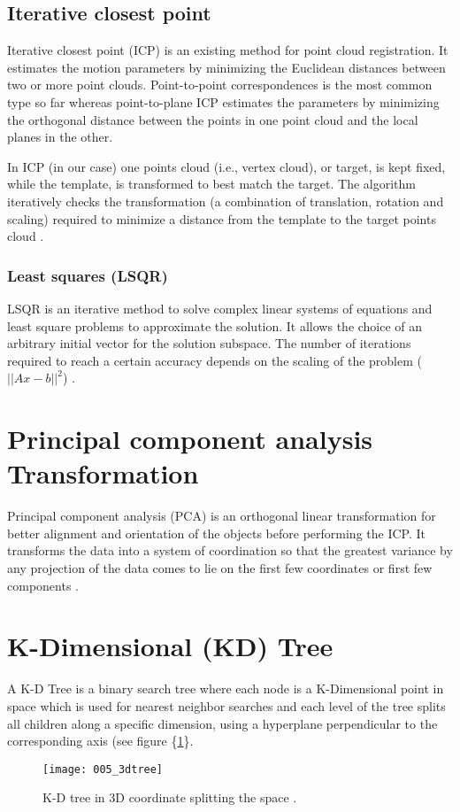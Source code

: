 \documentclass[../structure.tex]{subfiles}
\begin{document}
		\subsection{Iterative closest point}
		
		Iterative closest point (ICP) is an existing method for point cloud registration.  It estimates the motion parameters by minimizing the Euclidean distances between two or more point clouds. Point-to-point correspondences is the most common type so far whereas point-to-plane ICP estimates the parameters by minimizing the orthogonal distance between the points in one point cloud and the local planes in the other.
		
In ICP (in our case) one points cloud (i.e., vertex cloud), or target, is kept fixed, while the template, is transformed to best match the target. The algorithm iteratively checks the transformation (a combination of translation, rotation and scaling) required to minimize a distance from the template to the target points cloud \cite{Zhang1994}.

		 \subsubsection{Least squares (LSQR)}
		
		 LSQR is an iterative method to solve complex linear systems of equations and least square problems to approximate the solution. It allows the choice of an arbitrary initial vector for the solution subspace. The number of iterations required to reach a certain accuracy depends on the scaling of the problem ($ ||Ax-b||^2 $) \cite{Paige1982a}.

\section{Principal component analysis Transformation}

Principal component analysis (PCA) is an orthogonal linear transformation for better alignment and orientation of the objects before performing the ICP.  It transforms the data into a system of coordination so that the greatest variance by any projection of the data comes to lie on the first few coordinates or first few components \cite{Jolliffe2002}.


\section{K-Dimensional (KD) Tree}

A K-D Tree is a binary search tree where each node is a K-Dimensional point in space which is used for nearest neighbor searches and each level of the tree splits all children along a specific dimension, using a hyperplane perpendicular to the corresponding axis (see figure \{\ref{fig:k_d_tree}\}.

\begin{figure}[h!]
	\centering
	\texttt{[image: 005\_3dtree]}
	\captionsetup{justification=centering}
	\caption{K-D tree in 3D coordinate splitting the space \cite{Wikipedia2006}.}
	\label{fig:k_d_tree}
\end{figure}
\end{document}

